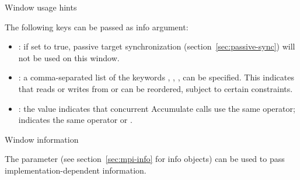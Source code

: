  {Window usage hints}
\label{sec:window-info}

The following keys can be passed as info argument:
\begin{itemize}
\item {}: if set to true, passive target synchronization
  (section~\ref{sec:passive-sync}) will not be used on this window.
\item {}: a comma-separated list of
  the keywords , ,
  ,  can be specified. This
  indicates that reads or writes from  or
   can be reordered, subject to
  certain constraints.
\item {}: the value 
  indicates that concurrent Accumulate calls use the same operator;
   indicates the same operator or
  .
\end{itemize}

 {Window information}
\label{sec:win-attr}

The  parameter
(see section~\ref{sec:mpi-info} for info objects)
can be used to pass implementation-dependent 
information.

